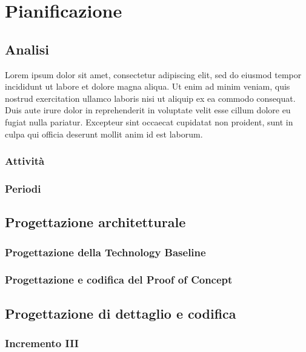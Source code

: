 \section{Pianificazione} \label{pianificazione}

\subsection{Analisi} \label{pianificazione_analisi}
Lorem ipsum dolor sit amet, consectetur adipiscing elit, sed do eiusmod tempor incididunt ut labore et dolore magna aliqua. Ut enim ad minim veniam, quis nostrud exercitation ullamco laboris nisi ut aliquip ex ea commodo consequat. Duis aute irure dolor in reprehenderit in voluptate velit esse cillum dolore eu fugiat nulla pariatur. Excepteur sint occaecat cupidatat non proident, sunt in culpa qui officia deserunt mollit anim id est laborum.
\subsubsection{Attività}
\subsubsection{Periodi}


\subsection{Progettazione architetturale} \label{progettazione_architetturale}
\subsubsection{Progettazione della Technology Baseline}
\subsubsection{Progettazione e codifica del Proof of Concept}


\subsection{Progettazione di dettaglio e codifica}
\subsubsection{Incremento III}
